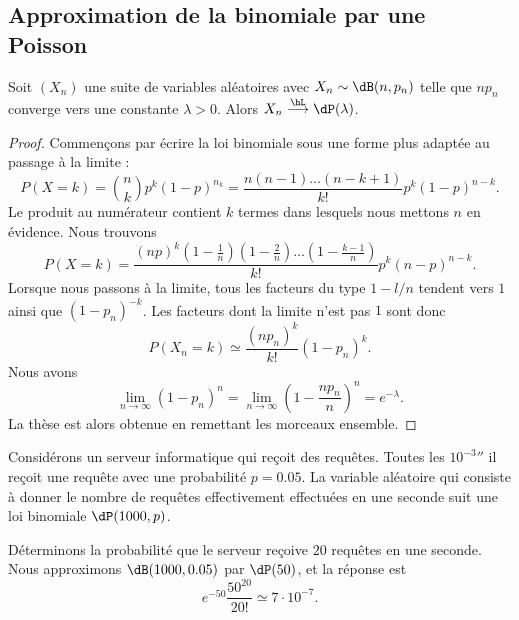 \subsection{Approximation de la binomiale par une Poisson}

\begin{proposition}
    Soit \( (X_n)\) une suite de variables aléatoires avec \( X_n\sim\dB(n,p_n)\) telle que \( np_n\) converge vers une constante \( \lambda>0\). Alors \( X_n\stackrel{\hL}{\longrightarrow}\dP(\lambda)\).
\end{proposition}

\begin{proof}
    Commençons par écrire la loi binomiale sous une forme plus adaptée au passage à la limite :
    \begin{equation}
        P(X=k)={n\choose k}p^k(1-p)^{n_k}=\frac{ n(n-1)\ldots (n-k+1) }{ k! }p^k(1-p)^{n-k}.
    \end{equation}
    Le produit au numérateur contient \( k\) termes dans lesquels nous mettons \( n\) en évidence. Nous trouvons
    \begin{equation}
        P(X=k)=\frac{ (np)^k\left( 1-\frac{1}{ n } \right)\left( 1-\frac{ 2 }{ n } \right)\ldots\left( 1-\frac{ k-1 }{ n } \right) }{ k! }p^k(n-p)^{n-k}.
    \end{equation}
    Lorsque nous passons à la limite, tous les facteurs du type \( 1-l/n\) tendent vers \( 1\) ainsi que \( (1-p_n)^{-k}\). Les facteurs dont la limite n'est pas \( 1\) sont donc
    \begin{equation}
        P(X_n=k)\simeq\frac{ (np_n)^k }{ k! }(1-p_n)^k.
    \end{equation}
    Nous avons
    \begin{equation}
        \lim_{n\to \infty} (1-p_n)^n=\lim_{n\to \infty} \left( 1-\frac{ np_n }{ n } \right)^n= e^{-\lambda}.
    \end{equation}
    La thèse est alors obtenue en remettant les morceaux ensemble.
\end{proof}

\begin{example}
    Considérons un serveur informatique qui reçoit des requêtes. Toutes les \( \unit{10^{-3}}{\second}\) il reçoit une requête avec une probabilité \( p=0.05\). La variable aléatoire qui consiste à donner le nombre de requêtes effectivement effectuées en une seconde suit une loi binomiale \( \dP(1000,p)\).

    Déterminons la probabilité que le serveur reçoive \( 20\) requêtes en une seconde. Nous approximons \( \dB(1000,0.05)\) par \( \dP(50)\), et la réponse est
    \begin{equation}
        e^{-50}\frac{ 50^{20} }{ 20! }\simeq 7\cdot 10^{-7}.
    \end{equation}
\end{example}


